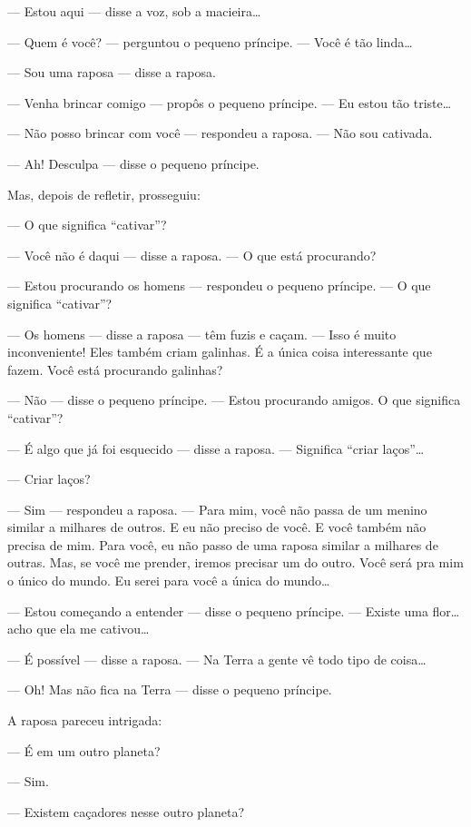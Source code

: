 \begin{Parallel}[p]{}{}
{--- Estou aqui --- disse a voz, sob a macieira\ldots{}

--- Quem é você? --- perguntou o pequeno príncipe. --- Você é tão linda\ldots{}

--- Sou uma raposa --- disse a raposa.

--- Venha brincar comigo --- propôs o pequeno príncipe. --- Eu estou tão
triste\ldots{}

--- Não posso brincar com você --- respondeu a raposa. --- Não sou cativada.

--- Ah! Desculpa --- disse o pequeno príncipe.

Mas, depois de refletir, prosseguiu:

--- O que significa ``cativar''?

--- Você não é daqui --- disse a raposa. --- O que está procurando?

--- Estou procurando os homens --- respondeu o pequeno príncipe. --- O que
significa ``cativar''?

--- Os homens --- disse a raposa --- têm fuzis e caçam. --- Isso é muito
inconveniente! Eles também criam galinhas. É a única coisa interessante
que fazem. Você está procurando galinhas?

--- Não --- disse o pequeno príncipe. --- Estou procurando amigos. O que
significa ``cativar''?

--- É algo que já foi esquecido --- disse a raposa. --- Significa ``criar
laços''\ldots{}

--- Criar laços?

--- Sim --- respondeu a raposa. --- Para mim, você não passa de um menino
similar a milhares de outros. E eu não preciso de você. E você também
não precisa de mim. Para você, eu não passo de uma raposa similar a
milhares de outras. Mas, se você me prender, iremos precisar um do
outro. Você será pra mim o único do mundo. Eu serei para você a única do
mundo\ldots{}

--- Estou começando a entender --- disse o pequeno príncipe. --- Existe uma
flor\ldots{} acho que ela me cativou\ldots{}

--- É possível --- disse a raposa. --- Na Terra a gente vê todo tipo de
coisa\ldots{}

--- Oh! Mas não fica na Terra --- disse o pequeno príncipe.

A raposa pareceu intrigada:

--- É em um outro planeta?

--- Sim.

--- Existem caçadores nesse outro planeta?

}
\end{Parallel}
